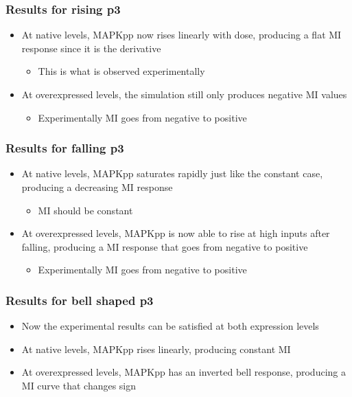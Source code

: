 \begin{frame}
  \frametitle{Results for rising p3}
  \begin{itemize}
    \itemsep3em
    \item At native levels, MAPKpp now rises linearly with dose, producing
      a flat MI response since it is the derivative
      \begin{itemize}
          \item This is what is observed experimentally
      \end{itemize}
    \item At overexpressed levels, the simulation still only produces negative MI
      values
      \begin{itemize}
          \item Experimentally MI goes from negative to positive
      \end{itemize}
  \end{itemize}
\end{frame}

\begin{frame}
  \frametitle{Results for falling p3}
  \begin{itemize}
    \itemsep3em
    \item At native levels, MAPKpp saturates rapidly just like the constant
      case, producing a decreasing MI response 
      \begin{itemize}
          \item MI should be constant
      \end{itemize}
    \item At overexpressed levels, MAPKpp is now able to rise at high inputs after
      falling, producing a MI response that goes from negative to positive
      \begin{itemize}
          \item Experimentally MI goes from negative to positive
      \end{itemize}
  \end{itemize}
\end{frame}

\begin{frame}
  \frametitle{Results for bell shaped p3}
  \begin{itemize}
    \itemsep3em
    \item Now the experimental results can be satisfied at both expression
      levels
    \item At native levels, MAPKpp rises linearly, producing constant MI 
    \item At overexpressed levels, MAPKpp has an inverted bell response,  
      producing a MI curve that changes sign
  \end{itemize}
\end{frame}
